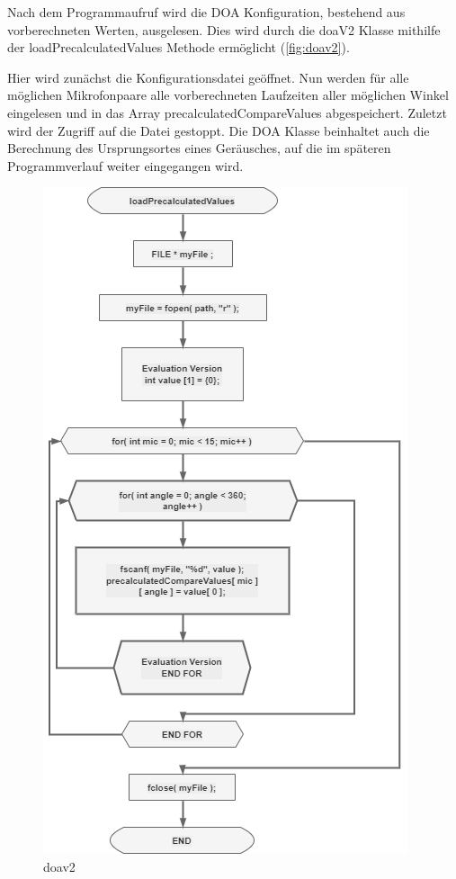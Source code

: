 Nach dem Programmaufruf wird die DOA Konfiguration, bestehend aus vorberechneten Werten, ausgelesen. Dies wird durch die doaV2 Klasse mithilfe der loadPrecalculatedValues Methode ermöglicht (\autoref{fig:doav2}).

Hier wird zunächst die Konfigurationsdatei geöffnet. Nun werden für alle möglichen Mikrofonpaare alle vorberechneten Laufzeiten aller möglichen Winkel eingelesen und in das Array precalculatedCompareValues abgespeichert. Zuletzt wird der Zugriff auf die Datei gestoppt. Die DOA Klasse beinhaltet auch die Berechnung des Ursprungsortes eines Geräusches, auf die im späteren Programmverlauf weiter eingegangen wird.

\begin{figure}[h]
	\begin{center}
		\includegraphics[scale=0.1]{Sections/Programmierung/doav2}
	\end{center}
	\caption{doav2}
	\label{fig:doav2}
\end{figure}


